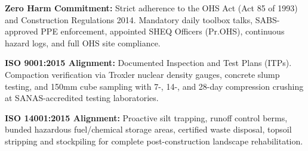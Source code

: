 \documentclass[a4paper,11pt]{article}
\providecommand{\faShieldAlt}{\faShield*}
\begin{document}
\noindent
\begin{minipage}[t]{0.31\textwidth}
    \begin{tcolorbox}[
        enhanced, colback=white, colframe=mhlightgray, boxrule=0.8pt, arc=4pt,
        title={\bfseries\color{white}\faShieldAlt\ Occupational Health \& Safety},
        colbacktitle=mhnavy, fonttitle=\bfseries\small,
        left=8pt, right=8pt, top=8pt, bottom=8pt, height=6.3cm,
        drop shadow=black!4
    ]
        {\fontsize{8.4pt}{11.8pt}\selectfont\color{mhtext}
        \textbf{Zero Harm Commitment:} Strict adherence to the OHS Act (Act 85 of 1993) and Construction Regulations 2014. Mandatory daily toolbox talks, SABS-approved PPE enforcement, appointed SHEQ Officers (Pr.OHS), continuous hazard logs, and full OHS site compliance.
        }
    \end{tcolorbox}
\end{minipage}
\hfill
\begin{minipage}[t]{0.31\textwidth}
    \begin{tcolorbox}[
        enhanced, colback=white, colframe=mhlightgray, boxrule=0.8pt, arc=4pt,
        title={\bfseries\color{white}\faCheckDouble\ Quality Assurance \& Testing},
        colbacktitle=mhblue, fonttitle=\bfseries\small,
        left=8pt, right=8pt, top=8pt, bottom=8pt, height=6.3cm,
        drop shadow=black!4
    ]
        {\fontsize{8.4pt}{11.8pt}\selectfont\color{mhtext}
        \textbf{ISO 9001:2015 Alignment:} Documented Inspection and Test Plans (ITPs). Compaction verification via Troxler nuclear density gauges, concrete slump testing, and 150mm cube sampling with 7-, 14-, and 28-day compression crushing at SANAS-accredited testing laboratories.
        }
    \end{tcolorbox}
\end{minipage}
\hfill
\begin{minipage}[t]{0.31\textwidth}
    \begin{tcolorbox}[
        enhanced, colback=white, colframe=mhlightgray, boxrule=0.8pt, arc=4pt,
        title={\bfseries\color{white}\faLeaf\ Environmental Management},
        colbacktitle=mhbluebright, fonttitle=\bfseries\small,
        left=8pt, right=8pt, top=8pt, bottom=8pt, height=6.3cm,
        drop shadow=black!4
    ]
        {\fontsize{8.4pt}{11.8pt}\selectfont\color{mhtext}
        \textbf{ISO 14001:2015 Alignment:} Proactive silt trapping, runoff control berms, bunded hazardous fuel/chemical storage areas, certified waste disposal, topsoil stripping and stockpiling for complete post-construction landscape rehabilitation.
        }
    \end{tcolorbox}
\end{minipage}
\end{document}
